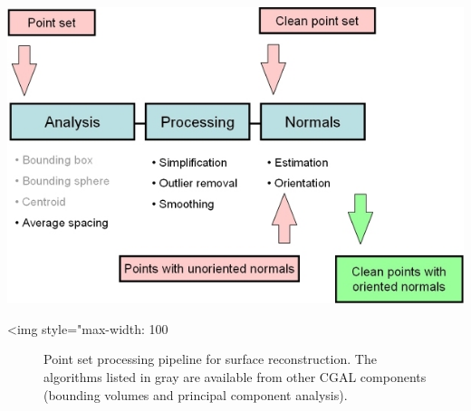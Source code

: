 \begin{center}
    \begin{ccTexOnly}
        \includegraphics[width=1.0\textwidth]{Point_set_processing_3/pipeline} %
    \end{ccTexOnly}
    \begin{ccHtmlOnly}
        <img style="max-width: 100%
    \end{ccHtmlOnly}
    \begin{figure}[h]
        \caption{Point set processing pipeline for surface reconstruction.
                 The algorithms listed in gray are available from other
                 CGAL components (bounding volumes and principal
                 component analysis).}
        \label{Point_set_processing_3-fig-pipeline}
    \end{figure}
\end{center}


